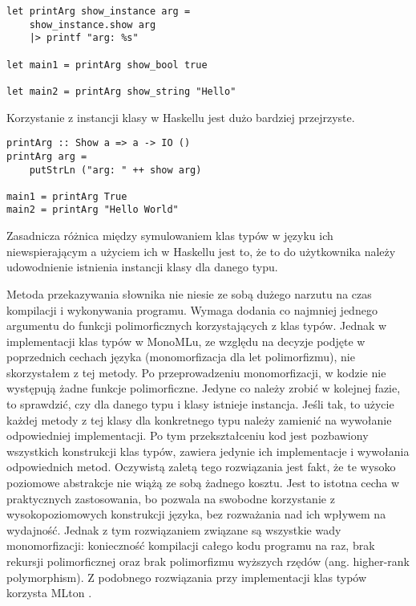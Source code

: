 \documentclass[declaration,shortabstract]{iithesis}
\begin{document}
\begin{lstlisting}[frame=lines]
let printArg show_instance arg = 
    show_instance.show arg
    |> printf "arg: %s" 

let main1 = printArg show_bool true 

let main2 = printArg show_string "Hello"
\end{lstlisting}
Korzystanie z instancji klasy w Haskellu jest dużo bardziej przejrzyste.
\begin{lstlisting}[frame=lines]
printArg :: Show a => a -> IO ()
printArg arg = 
    putStrLn ("arg: " ++ show arg)

main1 = printArg True
main2 = printArg "Hello World"
\end{lstlisting}



Zasadnicza różnica między symulowaniem klas typów w języku ich 
niewspierającym a użyciem ich w Haskellu jest to, że to do użytkownika należy 
udowodnienie istnienia instancji klasy dla danego typu.

Metoda przekazywania słownika nie niesie ze sobą dużego narzutu na czas 
kompilacji i wykonywania programu. Wymaga dodania co najmniej
jednego argumentu do funkcji polimorficznych korzystających z klas typów. 
Jednak w implementacji klas typów w MonoMLu, ze względu na decyzje 
podjęte w poprzednich cechach języka (monomorfizacja dla let polimorfizmu), 
nie skorzystałem z tej metody. Po przeprowadzeniu monomorfizacji, w kodzie nie 
występują żadne funkcje polimorficzne. Jedyne co należy zrobić w kolejnej 
fazie, to sprawdzić, czy dla danego typu i klasy istnieje instancja. Jeśli tak,
to użycie każdej metody z tej klasy dla konkretnego typu należy zamienić 
na wywołanie odpowiedniej implementacji. Po tym przekształceniu kod jest 
pozbawiony wszystkich konstrukcji klas typów, zawiera jedynie ich 
implementacje i wywołania odpowiednich metod. Oczywistą zaletą tego rozwiązania
jest fakt, że te wysoko poziomowe abstrakcje nie wiążą ze sobą żadnego kosztu.
Jest to istotna cecha w praktycznych zastosowania, bo pozwala na swobodne 
korzystanie z wysokopoziomowych konstrukcji języka, bez rozważania nad ich 
wpływem na wydajność. Jednak z tym rozwiązaniem związane są wszystkie wady 
monomorfizacji: konieczność kompilacji całego kodu 
programu na raz, 
brak rekursji polimorficznej oraz brak polimorfizmu wyższych 
rzędów (ang. higher-rank polymorphism).
Z podobnego rozwiązania przy implementacji klas typów 
korzysta MLton \cite{okmij}.
\end{document}
